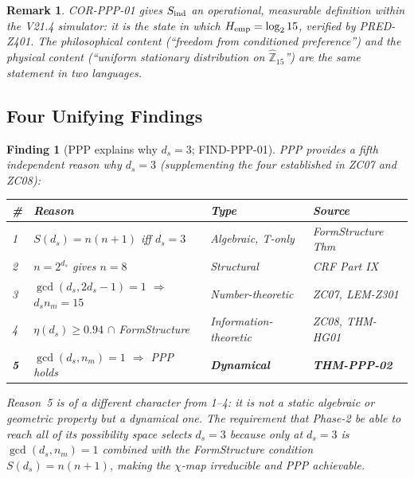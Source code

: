 \documentclass[12pt, a4paper]{article}
\newtheorem{remark}{Remark}[section]
\newtheorem{finding}{Finding}[section]
\begin{document}
\begin{remark}
COR-PPP-01 gives $S_{\rm ind}$ an operational, measurable definition
within the V21.4 simulator: it is the state in which $H_{\rm emp}
= \log_2 15$, verified by PRED-Z401. The philosophical content
(``freedom from conditioned preference'') and the physical content
(``uniform stationary distribution on $\hat{\mathbb{Z}}_{15}$'')
are the same statement in two languages.
\end{remark}

\subsection{Four Unifying Findings}
\label{sec:findings}

\begin{finding}[PPP explains why $d_s = 3$; FIND-PPP-01]
\label{find:ds3}
PPP provides a \emph{fifth} independent reason why $d_s = 3$
(supplementing the four established in ZC07 and ZC08):

\begin{center}
{\small
\renewcommand{\arraystretch}{1.30}
\begin{tabular}{p{0.4cm} p{4.5cm} p{3.5cm} p{3.5cm}}
\toprule
\# & Reason & Type & Source \\
\midrule
1 & $S(d_s) = n(n+1)$ iff $d_s = 3$
  & Algebraic, T-only & FormStructure Thm \\
2 & $n = 2^{d_s}$ gives $n = 8$
  & Structural & CRF Part IX \\
3 & $\gcd(d_s, 2d_s-1) = 1$ $\Rightarrow$ $d_s n_m = 15$
  & Number-theoretic & ZC07, LEM-Z301 \\
4 & $\eta(d_s) \geq 0.94$ $\cap$ FormStructure
  & Information-theoretic & ZC08, THM-HG01 \\
\textbf{5} & $\gcd(d_s, n_m) = 1$ $\Rightarrow$ PPP holds
  & \textbf{Dynamical} & \textbf{THM-PPP-02} \\
\bottomrule
\end{tabular}
}
\end{center}

Reason~5 is of a different character from 1--4: it is not a
static algebraic or geometric property but a \emph{dynamical}
one. The requirement that Phase-2 be able to reach all of its
possibility space selects $d_s = 3$ because only at $d_s = 3$
is $\gcd(d_s, n_m) = 1$ combined with the FormStructure
condition $S(d_s) = n(n+1)$, making the $\chi$-map irreducible
and PPP achievable.
\end{finding}
\end{document}
